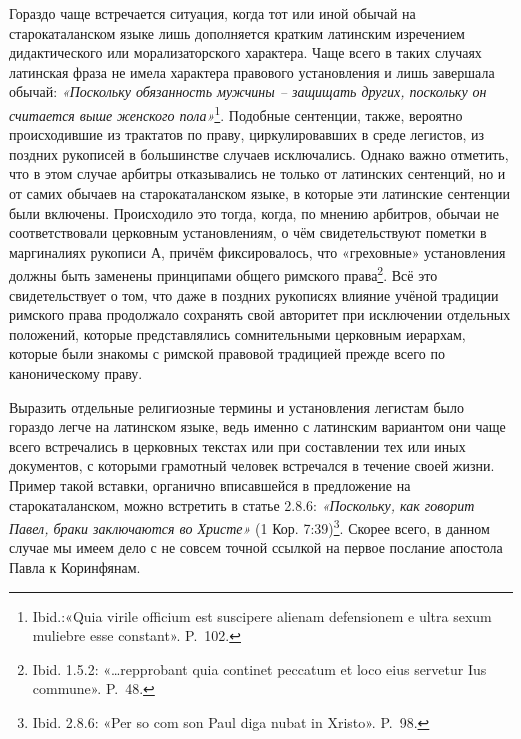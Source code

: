Гораздо чаще встречается ситуация, когда тот или иной обычай на старокаталанском языке лишь дополняется кратким латинским изречением дидактического или морализаторского характера. Чаще всего в таких случаях латинская фраза не имела характера правового установления и лишь завершала обычай: \emph{«Поскольку обязанность мужчины -- защищать других, поскольку он считается выше }\emph{женского пола»}\footnote{Ibid.:«Quia virile officium est suscipere alienam defensionem e ultra sexum muliebre esse constant». P.~102.}. Подобные сентенции, также, вероятно происходившие из трактатов по праву, циркулировавших в среде легистов, из поздних рукописей в большинстве случаев исключались. Однако важно отметить, что в этом случае арбитры отказывались не только от латинских сентенций, но и от самих обычаев на старокаталанском языке, в которые эти латинские сентенции были включены. Происходило это тогда, когда, по мнению арбитров, обычаи не соответствовали церковным установлениям, о чём свидетельствуют пометки в маргиналиях рукописи А, причём фиксировалось, что «греховные» установления должны быть заменены принципами общего римского права\footnote{Ibid. 1.5.2: «…repprobant quia continet peccatum et loco eius servetur Ius commune». P.~48.}. Всё это свидетельствует о том, что даже в поздних рукописях влияние учёной традиции римского права продолжало сохранять свой авторитет при исключении отдельных положений, которые представлялись сомнительными церковным иерархам, которые были знакомы с римской правовой традицией прежде всего по каноническому праву.

Выразить отдельные религиозные термины и установления легистам было гораздо легче на латинском языке, ведь именно с латинским вариантом они чаще всего встречались в церковных текстах или при составлении тех или иных документов, с которыми грамотный человек встречался в течение своей жизни. Пример такой вставки, органично вписавшейся в предложение на старокаталанском, можно встретить в статье 2.8.6: \emph{«Поскольку, как говорит Павел, браки заключаются во Христе» }(1 Кор. 7:39)\footnote{Ibid. 2.8.6: «Per so com son Paul diga nubat in Xristo». P.~98.}. Скорее всего, в данном случае мы имеем дело с не совсем точной ссылкой на первое послание апостола Павла к Коринфянам.

